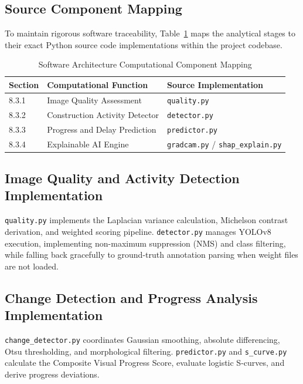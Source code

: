 \documentclass[conference]{IEEEtran}
\begin{document}
\subsection{Source Component Mapping}
To maintain rigorous software traceability, Table~\ref{tab:code_mapping} maps the analytical stages to their exact Python source code implementations within the project codebase.

\begin{table}[htbp]
    \caption{Software Architecture Computational Component Mapping}
    \label{tab:code_mapping}
    \centering
    \begin{tabular}{lll}
        \toprule
        \textbf{Section} & \textbf{Computational Function} & \textbf{Source Implementation} \\
        \midrule
        8.3.1 & Image Quality Assessment & \texttt{quality.py} \\
        8.3.2 & Construction Activity Detector & \texttt{detector.py} \\
        8.3.3 & Progress and Delay Prediction & \texttt{predictor.py} \\
        8.3.4 & Explainable AI Engine & \texttt{gradcam.py} / \texttt{shap\_explain.py} \\
        \bottomrule
    \end{tabular}
\end{table}

\subsection{Image Quality and Activity Detection Implementation}
\texttt{quality.py} implements the Laplacian variance calculation, Michelson contrast derivation, and weighted scoring pipeline. \texttt{detector.py} manages YOLOv8 execution, implementing non-maximum suppression (NMS) and class filtering, while falling back gracefully to ground-truth annotation parsing when weight files are not loaded.

\subsection{Change Detection and Progress Analysis Implementation}
\texttt{change\_detector.py} coordinates Gaussian smoothing, absolute differencing, Otsu thresholding, and morphological filtering. \texttt{predictor.py} and \texttt{s\_curve.py} calculate the Composite Visual Progress Score, evaluate logistic S-curves, and derive progress deviations.
\end{document}
